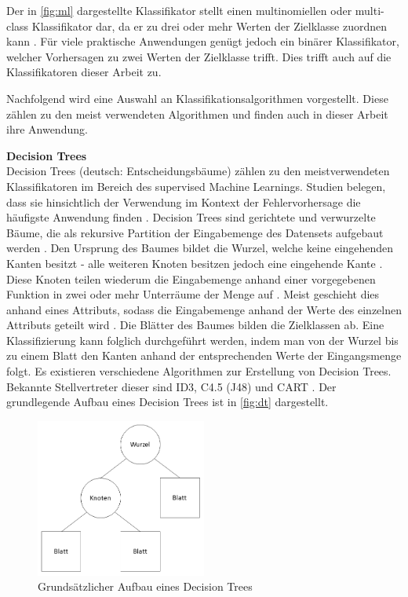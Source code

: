 Der in \autoref{fig:ml} dargestellte Klassifikator stellt einen multinomiellen oder multi-class Klassifikator dar, da er zu drei oder mehr Werten der Zielklasse zuordnen kann \cite{Sammut2017}. Für viele praktische Anwendungen genügt jedoch ein binärer Klassifikator, welcher Vorhersagen zu zwei Werten der Zielklasse trifft. Dies trifft auch auf die Klassifikatoren dieser Arbeit zu.

Nachfolgend wird eine Auswahl an Klassifikationsalgorithmen vorgestellt. Diese zählen zu den meist verwendeten Algorithmen und finden auch in dieser Arbeit ihre Anwendung.

\label{algorithms}
\textbf{Decision Trees\medskip}\\
Decision Trees (deutsch: Entscheidungsbäume) zählen zu den meistverwendeten Klassifikatoren im Bereich des supervised Machine Learnings. Studien belegen, dass sie hinsichtlich der Verwendung im Kontext der Fehlervorhersage die häufigste Anwendung finden \cite{Son2019}. Decision Trees sind gerichtete und verwurzelte Bäume, die als rekursive Partition der Eingabemenge des Datensets aufgebaut werden \cite{Rokach2005}. Den Ursprung des Baumes bildet die Wurzel, welche keine eingehenden Kanten besitzt - alle weiteren Knoten besitzen jedoch eine eingehende Kante \cite{Rokach2005}. Diese Knoten teilen wiederum die Eingabemenge anhand einer vorgegebenen Funktion in zwei oder mehr Unterräume der Menge auf \cite{Rokach2005}. Meist geschieht dies anhand eines Attributs, sodass die Eingabemenge anhand der Werte des einzelnen Attributs geteilt wird \cite{Rokach2005}. Die Blätter des Baumes bilden die Zielklassen ab. Eine Klassifizierung kann folglich durchgeführt werden, indem man von der Wurzel bis zu einem Blatt den Kanten anhand der entsprechenden Werte der Eingangsmenge folgt. Es existieren verschiedene Algorithmen zur Erstellung von Decision Trees. Bekannte Stellvertreter dieser sind ID3, C4.5 (J48) und CART \cite{Rokach2005}. Der grundlegende Aufbau eines Decision Trees ist in \autoref{fig:dt} dargestellt.

\begin{figure}[ht]
    \centering
    \includegraphics[width=0.5\textwidth]{images/DT}
    \caption{Grundsätzlicher Aufbau eines Decision Trees\label{fig:dt}}
\end{figure}

